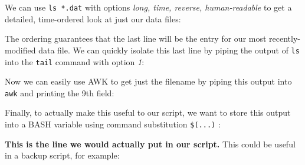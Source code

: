 \documentclass[10pt,a4]{article}
\begin{document}
We can use \texttt{ls *.dat} with options \textit{long, time, reverse, human-readable} to get a detailed, time-ordered look at just our data files:

\ttfamily
\colorbox{black}{}

\colorbox{black}{}
\normalfont

The ordering guarantees that the last line will be the entry for our most recently-modified data file.
We can quickly isolate this last line by piping the output of \texttt{ls} into the \texttt{tail} command with option \textit{1}:

\ttfamily
\colorbox{black}{}

\colorbox{black}{\color{white}{
-rw-rw-r-- 1 user user 273M Jul\ \ 1 14:23 run3.dat
}}
\normalfont

Now we can easily use AWK to get just the filename by piping this output into \texttt{awk} and printing the 9th field:

\ttfamily
\colorbox{black}{}

\colorbox{black}{\color{white}{
run3.dat
}}
\normalfont

Finally, to actually make this useful to our script, we want to store this output into a BASH variable using command substitution \texttt{\$(...)} :

\ttfamily
\colorbox{black}{}
\normalfont

\textbf{This is the line we would actually put in our script.} This could be useful in a backup script, for example:

\ttfamily
\colorbox{black}{}
\end{document}
